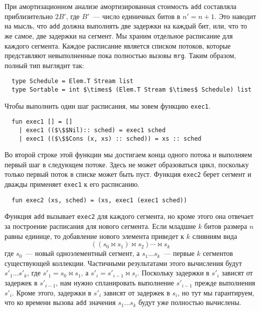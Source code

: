 При амортизационном анализе амортизированная стоимость
\lstinline!add! составляла приблизительно $2B'$, где $B'$~--- число
единичных битов в $n' = n + 1$. Это наводит на мысль, что
\lstinline!add! должна выполнять две задержки на каждый бит, или, что
то же самое, две задержки на сегмент. Мы храним отдельное расписание
для каждого сегмента. Каждое расписание является списком
потоков, которые представляют невыполненные пока полностью вызовы
\lstinline!mrg!. Таким образом, полный тип выглядит так:
\begin{lstlisting}
  type Schedule = Elem.T Stream list
  type Sortable = int $\times$ (Elem.T Stream $\times$ Schedule) list
\end{lstlisting}
Чтобы выполнить один шаг расписания, мы зовем функцию
\lstinline!exec1!.
\begin{lstlisting}
  fun exec1 [] = []
    | exec1 (($\$$Nil):: sched) = exec1 sched
    | exec1 (($\$$Cons (x, xs) :: sched)) = xs :: sched
\end{lstlisting}
Во второй строке этой функции мы достигаем конца одного потока и
выполняем первый шаг в следующем потоке. Здесь не может образоваться
цикл, поскольку только первый поток в списке может быть пуст. Функция
\lstinline!exec2! берет сегмент и дважды применяет \lstinline!exec1!
к его расписанию.
\begin{lstlisting}
  fun exec2 (xs, sched) = (xs, exec1 (exec1 sched))
\end{lstlisting}
Функция \lstinline!add! вызывает \lstinline!exec2! для каждого
сегмента, но кроме этого она отвечает за построение расписания для
нового сегмента. Если младшие $k$ битов размера $n$ равны единице, то
добавление нового элемента приведет к $k$ слияниям вида
$$
((s_0 \bowtie s_1) \bowtie s_2) \cdots \bowtie s_k
$$
где $s_0$~--- новый одноэлементный сегмент, а $s_1 \ldots s_k$~---
первые $k$ сегментов существующей коллекции. Частичными результатами
этого вычисления будут $s'_1 \ldots s'_k$, где $s'_1 = s_0 \bowtie
s_1$, а $s'_i = s'_{i-1} \bowtie s_i$. Поскольку задержки в $s'_i$
зависят от задержек в $s'_{i-1}$, нам нужно спланировать выполнение
$s'_{i-1}$ прежде выполнения $s'_i$.  Кроме этого, задержки в $s'_i$
зависят от задержек в $s_i$, но тут мы гарантируем, что ко времени
вызова \lstinline!add! значения $s_1 \ldots s_k$ будут уже полностью
вычислены.

